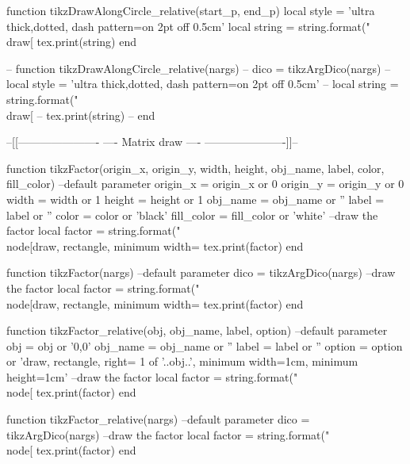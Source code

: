 \begin{luacode*}
	function tikzDrawAlongCircle_relative(start_p, end_p)
	  local style = 'ultra thick,dotted, dash pattern=on 2pt off 0.5cm'
	  local string = string.format("\\draw[%
	  tex.print(string)
	end

	-- function tikzDrawAlongCircle_relative(nargs)
	--   dico = tikzArgDico(nargs)
	--   local style = 'ultra thick,dotted, dash pattern=on 2pt off 0.5cm'
	--   local string = string.format("\\draw[%
	--   tex.print(string)
	-- end
  
	--[[----------------------
	----    Matrix draw   ----
	----------------------]]--
  
	function tikzFactor(origin_x, origin_y, width, height, obj_name, label, color, fill_color)
	  --default parameter
	  origin_x = origin_x or 0
	  origin_y = origin_y or 0
	  width = width or 1
	  height = height or 1
	  obj_name = obj_name or ''
	  label = label or ''
	  color = color or 'black'
	  fill_color = fill_color or 'white'
	  --draw the factor
	  local factor = string.format("\\node[draw, rectangle, minimum width=%
	  tex.print(factor)
	end

	function tikzFactor(nargs)
	  --default parameter
	  dico = tikzArgDico(nargs)
	  --draw the factor
	  local factor = string.format("\\node[draw, rectangle, minimum width=%
	  tex.print(factor)
	end
  
	function tikzFactor_relative(obj, obj_name, label, option)
	  --default parameter
	  obj = obj or '0,0'
	  obj_name = obj_name or ''
	  label = label or ''
	  option = option or 'draw, rectangle, right= 1 of '..obj..', minimum width=1cm, minimum height=1cm'
	  --draw the factor
	  local factor = string.format("\\node[%
	  tex.print(factor)
	end

	function tikzFactor_relative(nargs)
	  --default parameter
	  dico = tikzArgDico(nargs)
	  --draw the factor
	  local factor = string.format("\\node[%
	  tex.print(factor)
	end
  

\end{luacode*}
